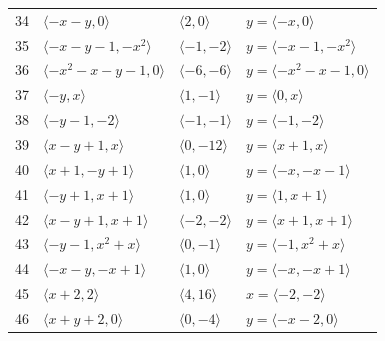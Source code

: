 \documentclass[11pt]{article}
\begin{document}
\begin{longtable}{@{}rlll@{}}
34 & $\langle -x-y,0\rangle$ & $\langle 2,0\rangle$ & $y=\langle -x,0\rangle$\\
35 & $\langle -x-y-1,-x^{2}\rangle$ & $\langle -1,-2\rangle$ & $y=\langle -x-1,-x^{2}\rangle$\\
36 & $\langle -x^{2}-x-y-1,0\rangle$ & $\langle -6,-6\rangle$ & $y=\langle -x^{2}-x-1,0\rangle$\\
37 & $\langle -y,x\rangle$ & $\langle 1,-1\rangle$ & $y=\langle 0,x\rangle$\\
38 & $\langle -y-1,-2\rangle$ & $\langle -1,-1\rangle$ & $y=\langle -1,-2\rangle$\\
39 & $\langle x-y+1,x\rangle$ & $\langle 0,-12\rangle$ & $y=\langle x+1,x\rangle$\\
40 & $\langle x+1,-y+1\rangle$ & $\langle 1,0\rangle$ & $y=\langle -x,-x-1\rangle$\\
41 & $\langle -y+1,x+1\rangle$ & $\langle 1,0\rangle$ & $y=\langle 1,x+1\rangle$\\
42 & $\langle x-y+1,x+1\rangle$ & $\langle -2,-2\rangle$ & $y=\langle x+1,x+1\rangle$\\
43 & $\langle -y-1,x^{2}+x\rangle$ & $\langle 0,-1\rangle$ & $y=\langle -1,x^{2}+x\rangle$\\
44 & $\langle -x-y,-x+1\rangle$ & $\langle 1,0\rangle$ & $y=\langle -x,-x+1\rangle$\\
45 & $\langle x+2,2\rangle$ & $\langle 4,16\rangle$ & $x=\langle -2,-2\rangle$\\
46 & $\langle x+y+2,0\rangle$ & $\langle 0,-4\rangle$ & $y=\langle -x-2,0\rangle$\\
\end{longtable}
\endgroup
\end{document}
